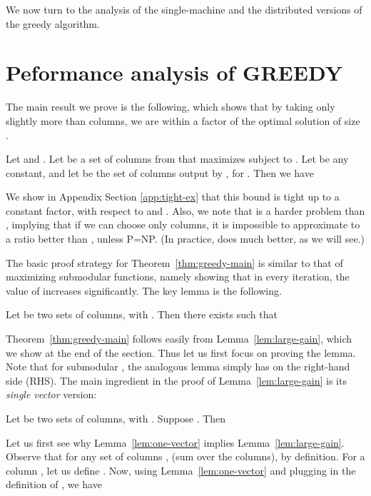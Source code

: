 \documentclass{article}
\begin{document}
We now turn to the analysis of the single-machine and the distributed versions of the greedy algorithm.


\section{Peformance analysis of GREEDY} \label{section-3}

The main result we prove is the following, which shows that by taking only slightly more than  columns, we are within a  factor of the optimal solution of size .

\begin{thm} \label{thm:greedy-main}
Let  and . Let  be a set of columns from  that maximizes  subject to .  Let  be any constant, and let  be the set of columns output by , for . Then we have
\end{thm}

We show in Appendix Section \ref{app:tight-ex} that this bound is tight up to a constant factor, with respect to  and . Also, we note that  is a harder problem than , implying that if we can choose only  columns, it is impossible to approximate to a ratio better than , unless P=NP. (In practice,  does much better, as we will see.)

The basic proof strategy for Theorem~\ref{thm:greedy-main} is similar to that of maximizing submodular functions, namely showing that in every iteration, the value of  increases significantly. The key lemma is the following.

\begin{lemma} \label{lem:large-gain}
Let  be two sets of columns, with .  Then there exists  such that

\end{lemma}

Theorem~\ref{thm:greedy-main} follows easily from Lemma~\ref{lem:large-gain}, which we show at the end of the section. Thus let us first focus on proving the lemma.  Note that for submodular , the analogous lemma simply has  on the right-hand side (RHS).
The main ingredient in the proof of Lemma~\ref{lem:large-gain} is its {\em single vector} version:
\begin{lemma}\label{lem:one-vector}
Let  be two sets of columns, with . Suppose .  Then

\end{lemma}

Let us first see why Lemma~\ref{lem:one-vector} implies Lemma~\ref{lem:large-gain}. Observe that for any set of columns ,  (sum over the columns), by definition. For a column , let us define . Now, using Lemma~\ref{lem:one-vector} and plugging in the definition of , we have
\end{document}
